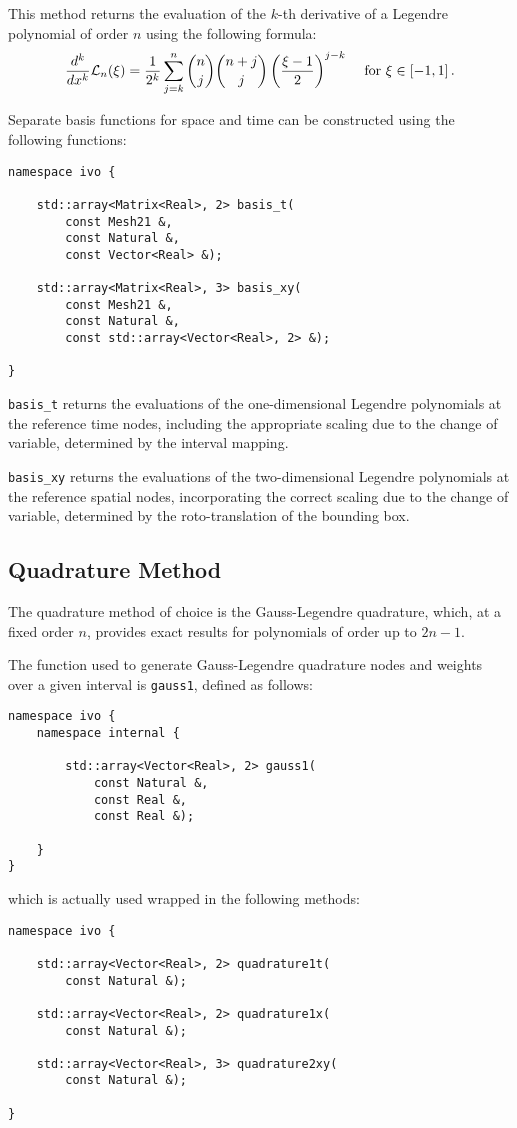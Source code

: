 This method returns the evaluation of the $k$-th derivative of a Legendre polynomial of order $n$ using the following formula:
\begin{align}
    \frac{d^k}{dx^k} \mathcal{L}_n(\xi) &= \frac{1}{2^k} \sum_{j = k}^{n} \binom{n}{j} \binom{n + j}{j} \left( \frac{\xi - 1}{2} \right)^{j - k} &\text{ for } \xi \in \left[ -1, 1 \right].
\end{align}

Separate basis functions for space and time can be constructed using the following functions:
\begin{lstlisting}[style=cpp]
namespace ivo {
    
    std::array<Matrix<Real>, 2> basis_t(
        const Mesh21 &, 
        const Natural &, 
        const Vector<Real> &);

    std::array<Matrix<Real>, 3> basis_xy(
        const Mesh21 &, 
        const Natural &, 
        const std::array<Vector<Real>, 2> &);

}
\end{lstlisting}

\lstinline{basis_t} returns the evaluations of the one-dimensional Legendre polynomials at the reference time nodes, including the appropriate scaling due to the change of variable, determined by the interval mapping.

\lstinline{basis_xy} returns the evaluations of the two-dimensional Legendre polynomials at the reference spatial nodes, incorporating the correct scaling due to the change of variable, determined by the roto-translation of the bounding box.

\newpage
\subsection{Quadrature Method} \label{subsection:quadrature}

The quadrature method of choice is the Gauss-Legendre quadrature, which, at a fixed order $n$, provides exact results for polynomials of order up to $2n - 1$.

The function used to generate Gauss-Legendre quadrature nodes and weights over a given interval is \lstinline{gauss1}, defined as follows:
\begin{lstlisting}[style=cpp]
namespace ivo {
    namespace internal {

        std::array<Vector<Real>, 2> gauss1(
            const Natural &, 
            const Real &, 
            const Real &);

    }
}
\end{lstlisting}
which is actually used wrapped in the following methods:
\begin{lstlisting}[style=cpp]
namespace ivo {

    std::array<Vector<Real>, 2> quadrature1t(
        const Natural &);

    std::array<Vector<Real>, 2> quadrature1x(
        const Natural &);

    std::array<Vector<Real>, 3> quadrature2xy(
        const Natural &);

}
\end{lstlisting}

